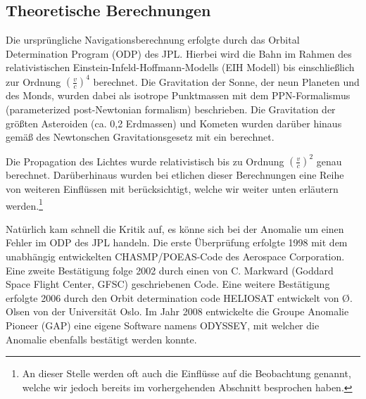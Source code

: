 
\subsection{Theoretische Berechnungen}
Die ursprüngliche Navigationsberechnung erfolgte durch das Orbital Determination Program (ODP) des JPL.
Hierbei wird die Bahn im Rahmen des relativistischen Einstein-Infeld-Hoffmann-Modells (EIH Modell)
bis einschließlich zur Ordnung $(\frac{v}{c})^4$ berechnet.
Die Gravitation der Sonne, der neun Planeten und des Monds, wurden dabei als isotrope Punktmassen mit dem
PPN-Formalismus (parameterized post-Newtonian formalism) beschrieben\cite{Anderson2002}. Die Gravitation der größten
Asteroiden (ca. 0,2 Erdmassen) und Kometen wurden darüber hinaus gemäß des Newtonschen Gravitationsgesetz mit
ein berechnet.

Die Propagation des Lichtes wurde relativistisch bis zu Ordnung $(\frac{v}{c})^2$ genau berechnet.
Darüberhinaus wurden bei etlichen dieser Berechnungen eine Reihe von weiteren Einflüssen mit berücksichtigt, welche wir
weiter unten %
erläutern werden.\footnote{An dieser Stelle werden oft auch die Einflüsse auf die Beobachtung genannt, welche wir jedoch
bereits im vorhergehenden Abschnitt besprochen haben.}

Natürlich kam schnell die Kritik auf, es könne sich bei der Anomalie um einen Fehler im ODP des JPL handeln.
Die erste Überprüfung erfolgte 1998 mit dem unabhängig entwickelten CHASMP/POEAS-Code des Aerospace
Corporation.
Eine zweite Bestätigung folge 2002 durch einen von C. Markward (Goddard Space Flight Center, GFSC) geschriebenen Code.
Eine weitere Bestätigung erfolgte 2006 durch den Orbit determination code HELIOSAT entwickelt von Ø. Olsen von der
Universität Oslo.
Im Jahr 2008 entwickelte die Groupe Anomalie Pioneer (GAP) eine eigene Software namens ODYSSEY,
mit welcher die Anomalie ebenfalls bestätigt werden konnte.
